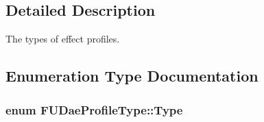 \subsection{Detailed Description}
The types of effect profiles. 

\subsection{Enumeration Type Documentation}
\hypertarget{namespaceFUDaeProfileType_ac10ea253a7a141708de2324a929f8a79}{
\subsubsection[{Type}]{\setlength{\rightskip}{0pt plus 5cm}enum {\bf FUDaeProfileType::Type}}}
\label{namespaceFUDaeProfileType_ac10ea253a7a141708de2324a929f8a79}
